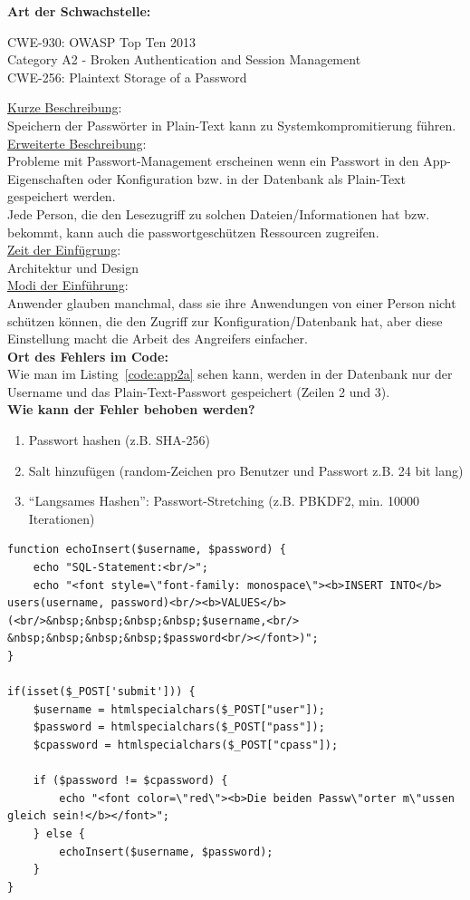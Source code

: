 \documentclass[12pt,a4paper,titlepage,oneside]{scrartcl}
\begin{document}
\textbf{Art der Schwachstelle:}
\begin{center}
CWE-930: OWASP Top Ten 2013 \\
Category A2 - Broken Authentication and Session Management \\
CWE-256: Plaintext Storage of a Password
\end{center}
\underline{Kurze Beschreibung}: \\[0.5em]
Speichern der Passwörter in Plain-Text kann zu Systemkompromitierung führen. \\[0.5em]
\underline{Erweiterte Beschreibung}: \\[0.5em]
Probleme mit Passwort-Management erscheinen wenn ein Passwort in den App-Eigenschaften oder Konfiguration bzw. in der Datenbank als Plain-Text gespeichert werden. \\
Jede Person, die den Lesezugriff zu solchen Dateien/Informationen hat bzw. bekommt, kann auch die passwortgeschützen Ressourcen zugreifen. \\[0.5em]
\underline{Zeit der Einfügrung}: \\[0.5em]
Architektur und Design \\[0.5em]
\underline{Modi der Einführung}: \\[0.5em]
Anwender glauben manchmal, dass sie ihre Anwendungen von einer Person nicht schützen können, die den Zugriff zur Konfiguration/Datenbank hat, aber diese Einstellung macht die Arbeit des Angreifers einfacher. \\[1em]
\textbf{Ort des Fehlers im Code:} \\[0.5em]
Wie man im Listing~\ref*{code:app2a} sehen kann, werden in der Datenbank nur der Username und das Plain-Text-Passwort gespeichert (Zeilen 2 und 3). \\[1em]
\textbf{Wie kann der Fehler behoben werden?}
\begin{enumerate}
	\item Passwort hashen (z.B. SHA-256)
	\item Salt hinzufügen (random-Zeichen pro Benutzer und Passwort z.B. 24 bit lang)
	\item "`Langsames Hashen"': Passwort-Stretching (z.B. PBKDF2, min. 10000 Iterationen)
\end{enumerate}

\begin{lstlisting}[caption=app2 mit Schwachstelle,label=code:app2a,style=c]
function echoInsert($username, $password) {
    echo "SQL-Statement:<br/>";
    echo "<font style=\"font-family: monospace\"><b>INSERT INTO</b> users(username, password)<br/><b>VALUES</b>(<br/>&nbsp;&nbsp;&nbsp;&nbsp;$username,<br/> &nbsp;&nbsp;&nbsp;&nbsp;$password<br/></font>)";
}

if(isset($_POST['submit'])) {
    $username = htmlspecialchars($_POST["user"]);
    $password = htmlspecialchars($_POST["pass"]);
    $cpassword = htmlspecialchars($_POST["cpass"]);

    if ($password != $cpassword) {
        echo "<font color=\"red\"><b>Die beiden Passw\"orter m\"ussen gleich sein!</b></font>";
    } else {
        echoInsert($username, $password);
    }
}
\end{lstlisting}
\end{document}
